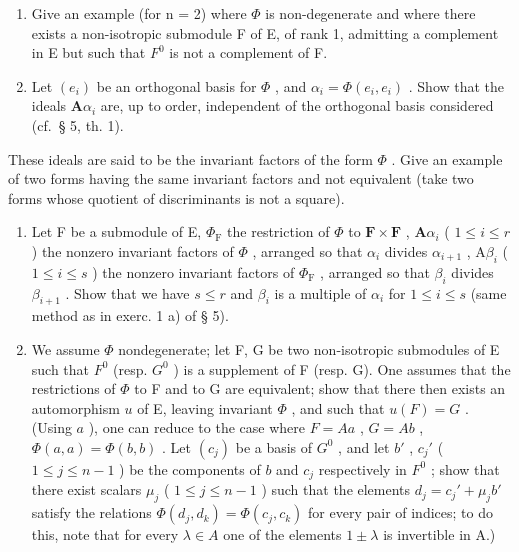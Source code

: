 \begin{enumerate}
\def\labelenumi{\alph{enumi})}
\setcounter{enumi}{1}
\item
  Give an example (for n = 2) where \(\Phi\) is non-degenerate and where there exists a non-isotropic submodule F of E, of rank 1, admitting a complement in E but such that \(F^{0}\) is not a complement of F.
\item
  Let \((e_i)\) be an orthogonal basis for \(\Phi\) , and \(\alpha_i = \Phi(e_i, e_i)\) . Show that the ideals \(\mathbf{A}\alpha_i\) are, up to order, independent of the orthogonal basis considered (cf.~§ 5, th. 1).
\end{enumerate}

These ideals are said to be the invariant factors of the form \(\Phi\) . Give an example of two forms having the same invariant factors and not equivalent (take two forms whose quotient of discriminants is not a square).

\begin{enumerate}
\def\labelenumi{\alph{enumi})}
\setcounter{enumi}{3}
\item
  Let F be a submodule of E, \(\Phi_{\mathrm{F}}\) the restriction of \(\Phi\) to \(\mathbf{F} \times \mathbf{F}\) , \(\mathbf{A}\alpha_{i}\) ( \(1 \leqslant i \leqslant r\) ) the nonzero invariant factors of \(\Phi\) , arranged so that \(\alpha_{i}\) divides \(\alpha_{i+1}\) , \(\mathrm{A}\beta_{i}\) ( \(1 \leqslant i \leqslant s\) ) the nonzero invariant factors of \(\Phi_{\mathrm{F}}\) , arranged so that \(\beta_{i}\) divides \(\beta_{i+1}\) . Show that we have \(s \leqslant r\) and \(\beta_{i}\) is a multiple of \(\alpha_{i}\) for \(1 \leqslant i \leqslant s\) (same method as in exerc. 1 a) of § 5).
\item
  We assume \(\Phi\) nondegenerate; let F, G be two non-isotropic submodules of E such that \(F^{0}\) (resp. \(G^{0}\) ) is a supplement of F (resp. G). One assumes that the restrictions of \(\Phi\) to F and to G are equivalent; show that there then exists an automorphism \(u\) of E, leaving invariant \(\Phi\) , and such that \(u(F) = G\) . (Using \(a\) ), one can reduce to the case where \(F = Aa\) , \(G = Ab\) , \(\Phi(a, a) = \Phi(b, b)\) . Let \((c_{j})\) be a basis of \(G^{0}\) , and let \(b'\) , \(c_{j}'\) ( \(1 \leqslant j \leqslant n - 1\) ) be the components of \(b\) and \(c_{j}\) respectively in \(F^{0}\) ; show that there exist scalars \(\mu_{j}\) ( \(1 \leqslant j \leqslant n - 1\) ) such that the elements \(d_{j} = c_{j}' + \mu_{j}b'\) satisfy the relations \(\Phi(d_{j}, d_{k}) = \Phi(c_{j}, c_{k})\) for every pair of indices; to do this, note that for every \(\lambda \in A\) one of the elements \(1 \pm \lambda\) is invertible in A.)
\end{enumerate}

